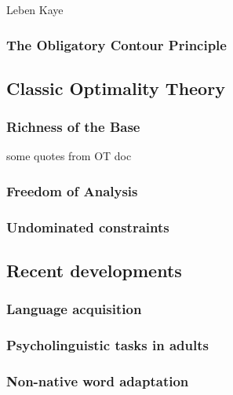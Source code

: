 Leben
Kaye

\subsubsection{The Obligatory Contour Principle}

\subsection{Classic Optimality Theory}


\subsubsection{Richness of the Base}

some quotes from OT doc
\citet{PE}
\citet{Bye2001}

\subsubsection{Freedom of Analysis}

\citet{Smolensky1996}
\citet{PE}

\subsubsection{Undominated constraints}


\subsection{Recent developments}

\subsubsection{Language acquisition}

\subsubsection{Psycholinguistic tasks in adults}


\subsubsection{Non-native word adaptation}

